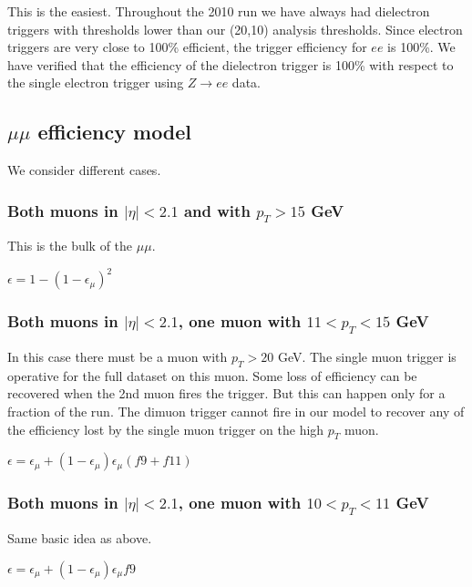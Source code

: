 This is the easiest.  Throughout the 2010 run we have always 
had dielectron triggers with thresholds lower than our (20,10)
analysis thresholds.  Since electron triggers are very close
to 100\% efficient\cite{ref:evans},
the trigger efficiency for $ee$ is 100\%.  We have verified that 
the efficiency of the dielectron trigger is 100\% with respect 
to the single electron trigger using $Z \to ee$ data.

\subsection{$\mu\mu$ efficiency model}
\label{sec:mmmodel} 

We consider different cases.

\subsubsection{Both muons in $|\eta|<2.1$ and with $p_T>15$ GeV}
This is the bulk of the $\mu\mu$.

\begin{center}
$\epsilon = 1 - (1-\epsilon_{\mu})^2$
\end{center}

\subsubsection{Both muons in $|\eta|<2.1$, one muon with $11<p_T<15$ GeV}
In this case there must be a muon with $p_T>20$ GeV.  The single muon
trigger is operative for the full dataset on this muon.  Some loss
of efficiency can be recovered when the 2nd muon fires the trigger.
But this can happen only for a fraction of the run.  The dimuon trigger
cannot fire in our model to recover any of the efficiency lost by 
the single muon trigger on the high $p_T$ muon.

\begin{center}
$\epsilon = \epsilon_{\mu} + (1-\epsilon_{\mu})\epsilon_{\mu}(f9+f11)$
\end{center}

\subsubsection{Both muons in $|\eta|<2.1$, one muon with $10<p_T<11$ GeV}
Same basic idea as above.

\begin{center}
$\epsilon = \epsilon_{\mu} + (1-\epsilon_{\mu})\epsilon_{\mu}f9$
\end{center}

